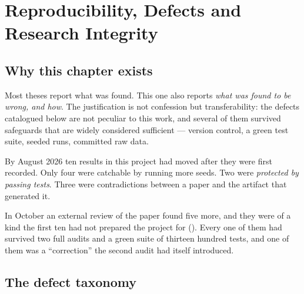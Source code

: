 \chapter{Reproducibility, Defects and Research Integrity}\label{ch:reproducibility}

\section{Why this chapter exists}

Most theses report what was found. This one also reports \emph{what was found to be wrong, and how}.
The justification is not confession but transferability: the defects catalogued below are not
peculiar to this work, and several of them survived safeguards that are widely considered
sufficient --- version control, a green test suite, seeded runs, committed raw data.

By August 2026 ten results in this project had moved after they were first recorded. Only four
were catchable by running more seeds. Two were \emph{protected by passing tests}. Three were
contradictions between a paper and the artifact that generated it.

In October an external review of the paper found five more, and they were of a kind the first ten
had not prepared the project for (). Every one of them had survived two full
audits and a green suite of thirteen hundred tests, and one of them was a ``correction'' the
second audit had itself introduced.

\section{The defect taxonomy}

